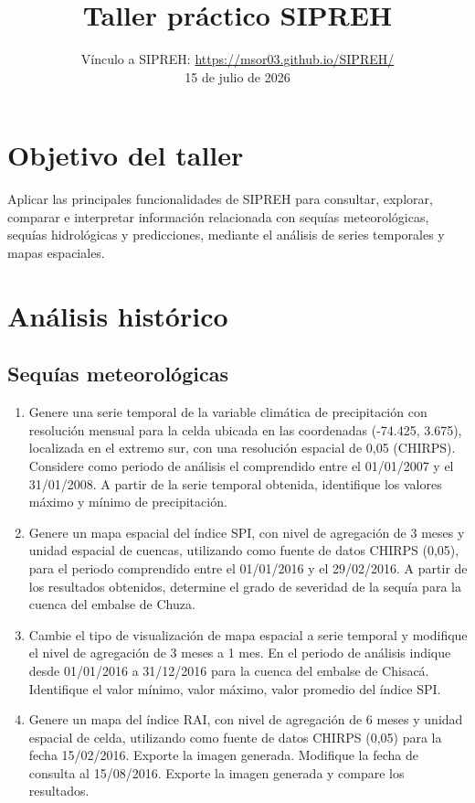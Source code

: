 \documentclass[12pt,a4paper,violet,openany]{bbe}
\title{Taller pr\'actico SIPREH}
\date{V\'inculo a SIPREH: \url{https://msor03.github.io/SIPREH/}\\[0.8em]15 de julio de 2026}
\begin{document}
\maketitle
\pagestyle{plain}

\section{Objetivo del taller}
Aplicar las principales funcionalidades de SIPREH para consultar, explorar, comparar e interpretar informaci\'on relacionada con sequ\'ias meteorol\'ogicas, sequ\'ias hidrol\'ogicas y predicciones, mediante el an\'alisis de series temporales y mapas espaciales.

\section{Análisis hist\'orico}

\subsection{Sequ\'ias meteorol\'ogicas}
\begin{enumerate}[leftmargin=*,label=\alph*)]
    \item Genere una serie temporal de la variable clim\'atica de precipitaci\'on con resoluci\'on mensual para la celda ubicada en las coordenadas (-74.425, 3.675), localizada en el extremo sur, con una resoluci\'on espacial de 0,05 \textdegree{} (CHIRPS). Considere como periodo de análisis el comprendido entre el 01/01/2007 y el 31/01/2008. A partir de la serie temporal obtenida, identifique los valores m\'aximo y m\'inimo de precipitaci\'on.
    \item Genere un mapa espacial del índice SPI, con nivel de agregaci\'on de 3 meses y unidad espacial de cuencas, utilizando como fuente de datos CHIRPS (0,05\textdegree{}), para el periodo comprendido entre el 01/01/2016 y el 29/02/2016. A partir de los resultados obtenidos, determine el grado de severidad de la sequ\'ia para la cuenca del embalse de Chuza.
    \item Cambie el tipo de visualizaci\'on de mapa espacial a serie temporal y modifique el nivel de agregaci\'on de 3 meses a 1 mes. En el periodo de análisis indique desde 01/01/2016 a 31/12/2016 para la cuenca del embalse de Chisacá. Identifique el valor m\'inimo, valor m\'aximo, valor promedio del índice SPI.
    \item Genere un mapa del índice RAI, con nivel de agregaci\'on de 6 meses y unidad espacial de celda, utilizando como fuente de datos CHIRPS (0,05\textdegree{}) para la fecha 15/02/2016. Exporte la imagen generada. Modifique la fecha de consulta al 15/08/2016. Exporte la imagen generada y compare los resultados.
\end{enumerate}
\end{document}
